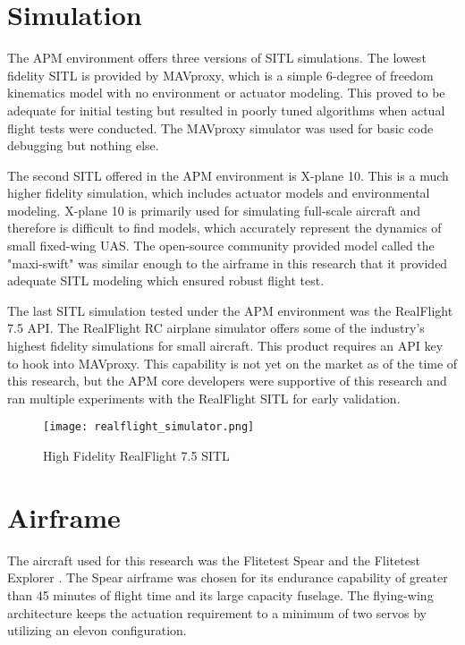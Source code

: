 \section{Simulation}
The \ac{APM} environment offers three versions of \ac{SITL} simulations.  The lowest fidelity \ac{SITL} is provided by MAVproxy, which is a simple 6-degree of freedom kinematics model with no environment or actuator modeling.  This proved to be adequate for initial testing but resulted in poorly tuned algorithms when actual flight tests were conducted.  The MAVproxy simulator was used for basic code debugging but nothing else.

The second \ac{SITL} offered in the \ac{APM} environment is X-plane 10.  This is a much higher fidelity simulation, which includes actuator models and environmental modeling.  X-plane 10 is primarily used for simulating full-scale aircraft and therefore is difficult to find models, which accurately represent the dynamics of small fixed-wing \ac{UAS}.  The open-source community provided model called the "maxi-swift" was similar enough to the airframe in this research that it provided adequate \ac{SITL} modeling which ensured robust flight test.

The last \ac{SITL} simulation tested under the \ac{APM} environment was the RealFlight 7.5 \ac{API}.  The RealFlight \ac{RC} airplane simulator offers some of the industry's highest fidelity simulations for small aircraft.  This product requires an \ac{API} key to hook into MAVproxy.  This capability is not yet on the market as of the time of this research, but the \ac{APM} core developers were supportive of this research and ran multiple experiments with the RealFlight \ac{SITL} for early validation.

\begin{figure}[h!]
 \centering
  \texttt{[image: realflight\_simulator.png]}
  \caption{High Fidelity RealFlight 7.5 \ac{SITL}}
  \label{fig:realflight_sitl}
\end{figure}


\section{Airframe}

The aircraft used for this research was the Flitetest Spear and the Flitetest Explorer \cite{flitetest}.  The Spear airframe was chosen for its endurance capability of greater than 45 minutes of flight time and its large capacity fuselage.  The flying-wing architecture keeps the actuation requirement to a minimum of two servos by utilizing an elevon configuration.  

